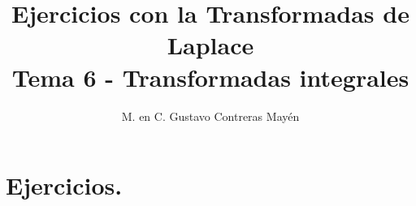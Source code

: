 
\title{Ejercicios con la Transformadas de Laplace \\ \large {Tema 6 - Transformadas integrales} \vspace{-3ex}}
\author{M. en C. Gustavo Contreras Mayén}
\date{ }

\vspace{-4cm}
\maketitle
\fontsize{14}{14}\selectfont
\tableofcontents
\newpage

\section{Ejercicios.}

